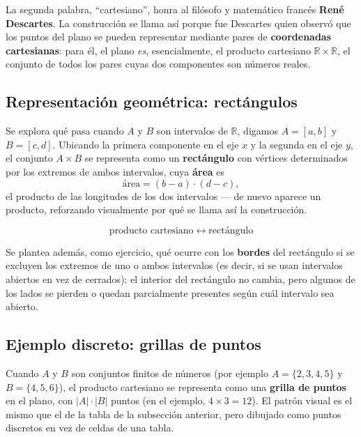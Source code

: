 \documentclass[12pt,a4paper]{article}
\begin{document}
La segunda palabra, ``cartesiano'', honra al filósofo y matemático francés \textbf{René Descartes}. La construcción se llama así porque fue Descartes quien observó que los puntos del plano se pueden representar mediante pares de \textbf{coordenadas cartesianas}: para él, el plano \emph{es}, esencialmente, el producto cartesiano $\mathbb R \times \mathbb R$, el conjunto de todos los pares cuyas dos componentes son números reales.

\subsection{Representación geométrica: rectángulos}

Se explora qué pasa cuando $A$ y $B$ son intervalos de $\mathbb R$, digamos $A=[a,b]$ y $B=[c,d]$. Ubicando la primera componente en el eje $x$ y la segunda en el eje $y$, el conjunto $A\times B$ se representa como un \textbf{rectángulo} con vértices determinados por los extremos de ambos intervalos, cuya \textbf{área} es
$$\text{área} = (b-a)\cdot(d-c),$$
el producto de las longitudes de los dos intervalos — de nuevo aparece un producto, reforzando visualmente por qué se llama así la construcción.

\begin{keybox}
$$\boxed{\text{producto cartesiano} \;\longleftrightarrow\; \text{rectángulo}}$$
\end{keybox}



Se plantea además, como ejercicio, qué ocurre con los \textbf{bordes} del rectángulo si se excluyen los extremos de uno o ambos intervalos (es decir, si se usan intervalos abiertos en vez de cerrados): el interior del rectángulo no cambia, pero algunos de los lados se pierden o quedan parcialmente presentes según cuál intervalo sea abierto.

\subsection{Ejemplo discreto: grillas de puntos}

Cuando $A$ y $B$ son conjuntos finitos de números (por ejemplo $A=\{2,3,4,5\}$ y $B=\{4,5,6\}$), el producto cartesiano se representa como una \textbf{grilla de puntos} en el plano, con $|A|\cdot|B|$ puntos (en el ejemplo, $4\times 3=12$). El patrón visual es el mismo que el de la tabla de la subsección anterior, pero dibujado como puntos discretos en vez de celdas de una tabla.
\end{document}

